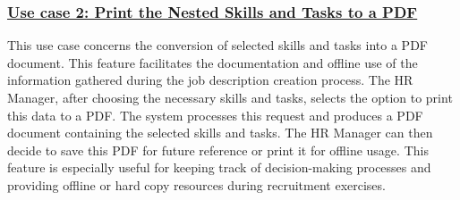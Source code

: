 \subsubsection{\underline{Use case 2: Print the Nested Skills and Tasks to a PDF}}
This use case concerns the conversion of selected skills and tasks into a PDF document. This feature facilitates the documentation and offline use of the information gathered during the job description creation process. The HR Manager, after choosing the necessary skills and tasks, selects the option to print this data to a PDF. The system processes this request and produces a PDF document containing the selected skills and tasks. The HR Manager can then decide to save this PDF for future reference or print it for offline usage. This feature is especially useful for keeping track of decision-making processes and providing offline or hard copy resources during recruitment exercises.

